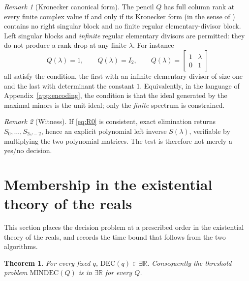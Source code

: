 \documentclass[journal]{IEEEtran}
\theoremstyle{plainn}
\newtheorem{thm}{Theorem}
\theoremstyle{remark}
\newtheorem{remark}{Remark}
\begin{document}
\begin{remark}[Kronecker canonical form]\label{rem:kronecker}
The pencil $Q$ has full column rank at every finite complex value if and only if
its Kronecker form (in the sense of \cite{bee88}) contains no right singular
block and no finite regular elementary-divisor block. Left singular blocks and
\emph{infinite} regular elementary divisors are permitted: they do not produce a
rank drop at any finite $\lambda$. For instance
\begin{equation*}
Q(\lambda)=1,\qquad Q(\lambda)=I_2,\qquad
Q(\lambda)=\begin{bmatrix}1&\lambda\\0&1\end{bmatrix}
\end{equation*}
all satisfy the condition, the first with an infinite elementary divisor of size
one and the last with determinant the constant $1$. Equivalently, in the
language of Appendix~\ref{app:encoding}, the condition is that the ideal
generated by the maximal minors is the unit ideal; only the \emph{finite}
spectrum is constrained.
\end{remark}

\begin{remark}[Witness]\label{rem:witness}
If \eqref{eq:R0} is consistent, exact elimination returns
$S_0,\dots,S_{2\omega-2}$, hence an explicit polynomial left inverse
$S(\lambda)$, verifiable by multiplying the two polynomial matrices. The test is
therefore not merely a yes/no decision.
\end{remark}

\section{Membership in the existential theory of the reals}\label{sec:existsr}

This section places the decision problem at a prescribed order in the existential theory of the reals, and records the time bound that follows from the two algorithms.

\begin{thm}\label{thm:existsr}
For every fixed $q$, $\mathrm{DEC}(q)\in\exists\mathbb R$. Consequently the threshold problem $\mathrm{MINDEC}(Q)$ is in $\exists\mathbb R$ for every $Q$.
\end{thm}
\end{document}

